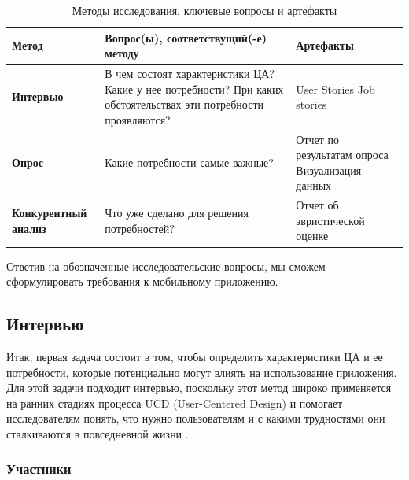 \documentclass[pdflatex,sn-mathphys-num]{sn-jnl}%
\theoremstyle{thmstyleone}%
\theoremstyle{thmstyletwo}%
\theoremstyle{thmstylethree}%
\begin{document}
\begin{table}[h]
\normalsize
\caption{Методы исследования, ключевые вопросы и артефакты}
\label{tab:table1}
\begin{tabular}{|l|p{5cm}|p{5cm}|}
\hline
\textbf{Метод}           & \textbf{Вопрос(ы), соответствущий(-е) методу}                                                                                  & \textbf{Артефакты}                                      \\ \hline
\textbf{Интервью}        & В чем состоят характеристики ЦА? \newline Какие у нее потребности? \newline При каких обстоятельствах эти потребности проявляются? & User Stories \newline Job stories                \\ \hline
\textbf{Опрос}           & Какие потребности самые важные?                                                                                                & Отчет по результатам опроса \newline Визуализация данных \\ \hline
\textbf{Конкурентный анализ} & Что уже сделано для решения потребностей?                                                                                      & Отчет об эвристической оценке                            \\ \hline
\end{tabular}
\end{table}

Ответив на обозначенные исследовательские вопросы, мы сможем сформулировать требования к мобильному приложению.

\subsection{Интервью}\label{Interview}

Итак, первая задача состоит в том, чтобы определить характеристики ЦА и ее потребности, которые потенциально могут влиять на использование приложения. Для этой задачи подходит интервью, поскольку этот метод широко применяется на ранних стадиях процесса UCD (User-Centered Design) и помогает исследователям понять, что нужно пользователям и с какими трудностями они сталкиваются в повседневной жизни \cite{LAZAR2017187, user_interviews}. 

\subsubsection{Участники}
\end{document}
